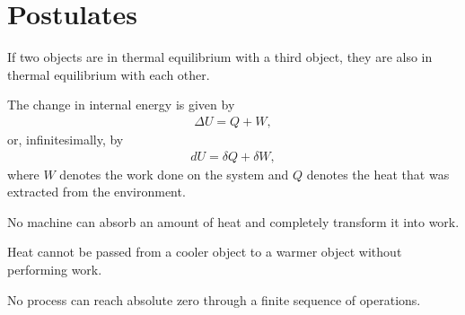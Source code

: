\section{Postulates}

    \begin{axiom}
        If two objects are in thermal equilibrium with a third object, they are also in thermal equilibrium with each other.
    \end{axiom}
    \begin{axiom}
        The change in internal energy is given by
        \begin{gather}
            \label{thermo:first_law}
            \Delta U = Q + W,
        \end{gather}
        or, infinitesimally, by
        \begin{gather}
            \label{thermo:first_law_differential}
            dU = \delta Q + \delta W,
        \end{gather}
        where $W$ denotes the work done on the system and $Q$ denotes the heat that was extracted from the environment.
    \end{axiom}

    \begin{axiom}
        No machine can absorb an amount of heat and completely transform it into work.
    \end{axiom}
    \begin{axiom}
        Heat cannot be passed from a cooler object to a warmer object without performing work.
    \end{axiom}


    \begin{axiom}
        No process can reach absolute zero through a finite sequence of operations.
    \end{axiom}

